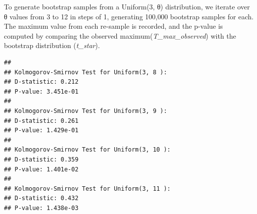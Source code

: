\documentclass[
  11pt,
]{article}
\newenvironment{Shaded}{\begin{snugshade}}{\end{snugshade}}
\newcommand{\AttributeTok}[1]{\textcolor[rgb]{0.13,0.29,0.53}{#1}}
\newcommand{\ControlFlowTok}[1]{\textcolor[rgb]{0.13,0.29,0.53}{\textbf{#1}}}
\newcommand{\DecValTok}[1]{\textcolor[rgb]{0.00,0.00,0.81}{#1}}
\newcommand{\FunctionTok}[1]{\textcolor[rgb]{0.13,0.29,0.53}{\textbf{#1}}}
\newcommand{\NormalTok}[1]{#1}
\newcommand{\OtherTok}[1]{\textcolor[rgb]{0.56,0.35,0.01}{#1}}
\newcommand{\SpecialCharTok}[1]{\textcolor[rgb]{0.81,0.36,0.00}{\textbf{#1}}}
\newcommand{\StringTok}[1]{\textcolor[rgb]{0.31,0.60,0.02}{#1}}
\begin{document}
To generate bootstrap samples from a Uniform(3, θ) distribution, we
iterate over θ values from 3 to 12 in steps of 1, generating 100,000
bootstrap samples for each. The maximum value from each re-sample is
recorded, and the p-value is computed by comparing the observed
maximum(\emph{T\_max\_observed}) with the bootstrap distribution
(\emph{t\_star}).

\begin{Shaded}
\end{Shaded}

\begin{verbatim}
## 
## Kolmogorov-Smirnov Test for Uniform(3, 8 ):
## D-statistic: 0.212 
## P-value: 3.451e-01 
## 
## Kolmogorov-Smirnov Test for Uniform(3, 9 ):
## D-statistic: 0.261 
## P-value: 1.429e-01 
## 
## Kolmogorov-Smirnov Test for Uniform(3, 10 ):
## D-statistic: 0.359 
## P-value: 1.401e-02 
## 
## Kolmogorov-Smirnov Test for Uniform(3, 11 ):
## D-statistic: 0.432 
## P-value: 1.438e-03
\end{verbatim}
\end{document}
